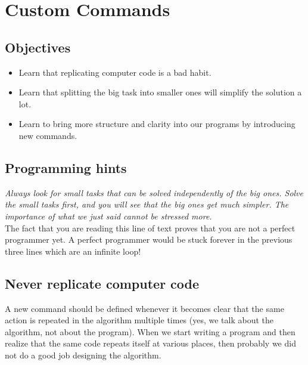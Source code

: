 
\section{Custom Commands} \label{sec:newcom}

\subsection{Objectives} 
 
\begin{itemize}
\item Learn that replicating computer code is a bad habit.
\item Learn that splitting the big task into smaller ones will simplify the solution a lot. 
\item Learn to bring more structure and clarity into our programs by introducing new commands.
\end{itemize}

\subsection{Programming hints}

{\em Always look for small tasks that can be solved independently of the big ones.
Solve the small tasks first, and you will see that the big ones get much simpler. The 
importance of what we just said cannot be stressed more.}\\

\noindent
The fact that you are reading this line of text proves that you are not 
a perfect programmer yet. A perfect programmer would be stuck forever 
in the previous three lines which are an infinite loop!


\subsection{Never replicate computer code}

A new command should be defined whenever it becomes clear that the same 
action is repeated in the algorithm multiple times (yes, we talk about the algorithm,
not about the program). When we start writing a program and then realize that the same
code repeats itself at various places, then probably we did not do a good job 
designing the algorithm.

